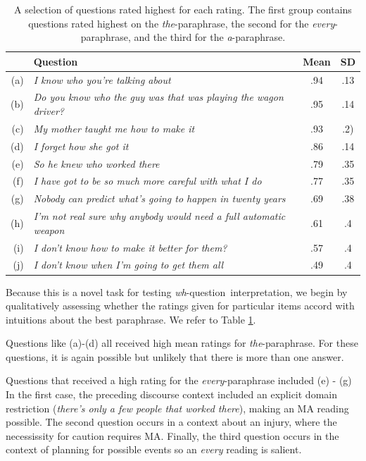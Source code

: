 \documentclass[12pt,letterpaper,table,svgnames,dvipsnames]{article}
\newcommand{\whq}{\emph{wh}-question~}
\begin{document}
\begin{table}[h!]
    \centering
    \begin{tabular}{rlcc}
        \toprule
        {} & \textbf{Question} & \textbf{Mean} & \textbf{SD} \\
        \midrule
        (a) & \emph{I know who you’re talking about}       & .94   & .13\\
        (b) & \emph{Do you know who the guy was that was playing the wagon driver?}       &.95  & .14 \\
        (c) & \emph{My mother taught me how to make it}   &.93    & .2) \\
        (d) & \emph{I forget how she got it}   &.86 &.14\\
        \midrule
        (e) & \emph{So he knew who worked there} & .79 & .35 \\
        (f) & \emph{I have got to be so much more careful with what I do} &.77 & .35 \\
        (g) & \emph{Nobody can predict what's going to happen in twenty years} & .69 & .38\\
        \midrule
        (h) & \emph{I’m not real sure why anybody would need a full automatic weapon} & .61 & .4\\
        (i) & \emph{I don’t know how to make it better for them?} & .57 & .4\\
        (j) & \emph{I don’t know when I’m going to get them all} & .49 & .4 \\
        \bottomrule
    \end{tabular}
    \caption{A selection of questions rated highest for each rating. The first group contains questions rated highest on the \emph{the}-paraphrase, the second for the \emph{every}-paraphrase, and the third for the \emph{a}-paraphrase.}
    \label{tab:e2-qualitative}
\end{table}
Because this is a novel task for testing \whq interpretation, we begin by qualitatively assessing whether the ratings given for particular items accord with intuitions about the best paraphrase. We refer to Table \ref{tab:e2-qualitative}.

Questions like (a)-(d)
all received high mean ratings for \emph{the}-paraphrase. For these questions, it is again possible but unlikely that there is more than one answer.

Questions that received a high rating for the \emph{every}-paraphrase included (e) - (g)
In the first case, the preceding discourse context included an explicit domain restriction (\emph{there's only a few people that worked there}), making an MA reading possible. The second question occurs in a context about an injury, where the necessissity for caution requires MA. Finally, the third question occurs in the context of planning for possible events so an \emph{every} reading is salient.
\end{document}
